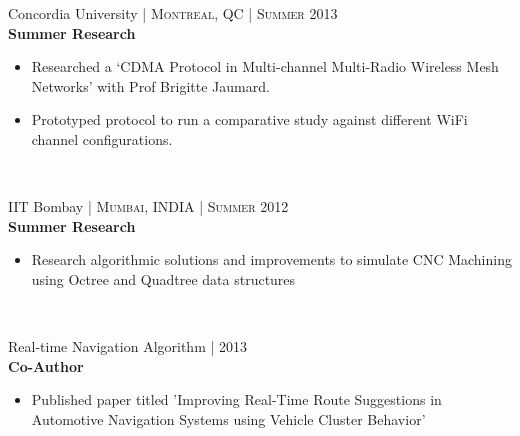 \documentclass[10pt]{article} %
\begin{document}
{\begin{minipage}[t]{0.57\textwidth}

{\raggedright\large Concordia University \normalsize\textsc{ | Montreal, QC | Summer 2013}\\
\textbf{Summer Research}\\[5pt]}
\begin{itemize}\itemsep-0.25em
    \item Researched a ‘CDMA Protocol in Multi-channel Multi-Radio Wireless Mesh Networks’ with Prof Brigitte Jaumard.
    \item Prototyped protocol to run a comparative study against different WiFi channel configurations.
\end{itemize}\\



{\raggedright\large IIT Bombay \normalsize\textsc{ | Mumbai, INDIA | Summer 2012}\\
\textbf{Summer Research}\\[5pt]}
\begin{itemize}\itemsep-0.25em
    \item Research algorithmic solutions and improvements  to simulate CNC Machining using Octree and Quadtree data structures
\end{itemize}\\



{\raggedright\large Real-time Navigation Algorithm \normalsize\textsc{ | 2013}\\
\textbf{Co-Author}\\[5pt]}
\begin{itemize}\itemsep-0.25em \item Published paper titled 'Improving Real-Time Route Suggestions in Automotive Navigation Systems using Vehicle Cluster Behavior'
\end{itemize}\\



\end{minipage}}
\end{document}
